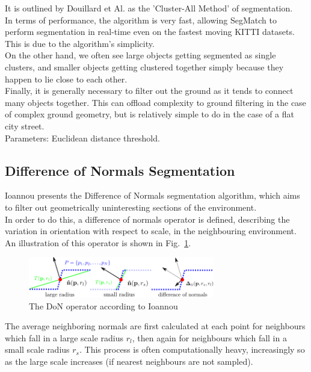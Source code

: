 It is outlined by Douillard et Al. \cite{douillard2011segmentation} as the 'Cluster-All Method' of segmentation.\\

In terms of performance, the algorithm is very fast, allowing SegMatch to perform segmentation in real-time even on the fastest moving KITTI \cite{KITTI} datasets. This is due to the algorithm's simplicity.\\

On the other hand, we often see large objects getting segmented as single clusters, and smaller objects getting clustered together simply because they happen to lie close to each other.\\

Finally, it is generally necessary to filter out the ground as it tends to connect many objects together. This can offload complexity to ground filtering in the case of complex ground geometry, but is relatively simple to do in the case of a flat city street.\\

Parameters: Euclidean distance threshold.

\subsection{Difference of Normals Segmentation}
\label{subsec:DoN}

Ioannou \cite{ioannou2012difference} presents the Difference of Normals segmentation algorithm, which aims to filter out geometrically uninteresting sections of the environment.\\

In order to do this, a difference of normals operator is defined, describing the variation in orientation with respect to scale, in the neighbouring environment. An illustration of this operator is shown in Fig.~\ref{fig:DoN}.\\

\begin{figure}
  \centering
  \includegraphics[width=3.2in]{images/DoN.png}
  \caption{The DoN operator according to Ioannou \cite{ioannou2012difference}}
  \label{fig:DoN}
\end{figure}

The average neighboring normals are first calculated at each point for neighbours which fall in a large scale radius $r_l$, then again for neighbours which fall in a small scale radius $r_s$. This process is often computationally heavy, increasingly so as the large scale increases (if nearest neighbours are not sampled).\\

